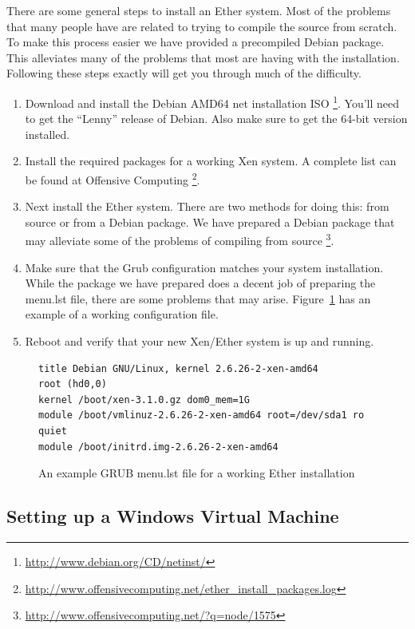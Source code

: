 \documentclass[11pt]{article}
\begin{document}
There are some general steps to install an Ether system. Most of the
problems that many people have are related to trying to compile the
source from scratch. To make this process easier we have provided a
precompiled Debian package. This alleviates many of the problems that
most are having with the installation. Following these steps exactly
will get you through much of the difficulty.

\begin{enumerate}
\item Download and install the Debian AMD64 net installation
ISO \footnote{\url{http://www.debian.org/CD/netinst/}}. You'll need to
get the ``Lenny'' release of Debian. Also make sure to get the 64-bit
version installed.
\item Install the required packages for a working Xen system. A
complete list can be found at Offensive Computing
\footnote{\url{http://www.offensivecomputing.net/ether_install_packages.log}}.
\item Next install the Ether system. There are two methods for doing
this: from source or from a Debian package. We have prepared a Debian
package that may alleviate some of the problems of compiling from
source
\footnote{\url{http://www.offensivecomputing.net/?q=node/1575}}.
\item Make sure that the Grub configuration matches your system
installation. While the package we have prepared does a decent job of
preparing the menu.lst file, there are some problems that may
arise. Figure~\ref{fig:menu_lst} has an example of a working
configuration file.
\item Reboot and verify that your new Xen/Ether system is up and
running.
\end{enumerate}

\begin{figure}[htb]
\centering
\begin{verbatim}
title Debian GNU/Linux, kernel 2.6.26-2-xen-amd64
root (hd0,0)
kernel /boot/xen-3.1.0.gz dom0_mem=1G
module /boot/vmlinuz-2.6.26-2-xen-amd64 root=/dev/sda1 ro quiet
module /boot/initrd.img-2.6.26-2-xen-amd64
\end{verbatim}
\caption{An example GRUB menu.lst file for a working Ether installation}\label{fig:menu_lst}
\end{figure}

\subsection{Setting up a Windows Virtual Machine}
\end{document}
